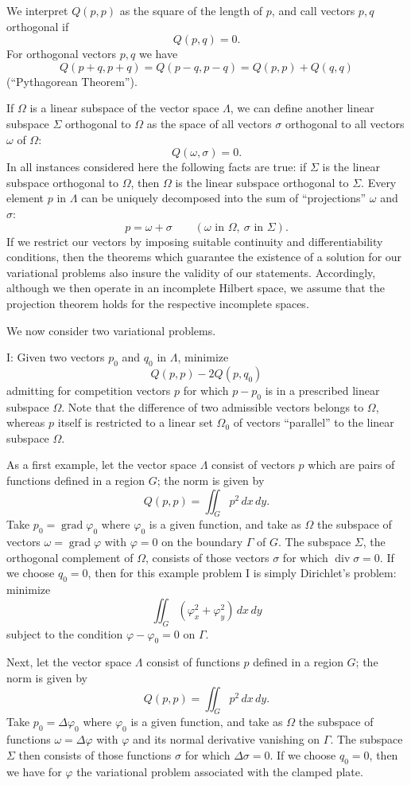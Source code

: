We interpret $Q(p,p)$ as the square of the length of $p$, and call vectors $p,q$ orthogonal if
\[
Q(p,q)=0.
\]
For orthogonal vectors $p,q$ we have
\[
Q(p+q,p+q)=Q(p-q,p-q)=Q(p,p)+Q(q,q)
\]
(``Pythagorean Theorem'').

If $\Omega$ is a linear subspace of the vector space $\Lambda$, we can define another linear subspace $\Sigma$ orthogonal to $\Omega$ as the space of all vectors $\sigma$ orthogonal to all vectors $\omega$ of $\Omega$:
\[
Q(\omega,\sigma)=0.
\]
In all instances considered here the following facts are true: if $\Sigma$ is the linear subspace orthogonal to $\Omega$, then $\Omega$ is the linear subspace orthogonal to $\Sigma$. Every element $p$ in $\Lambda$ can be uniquely decomposed into the sum of ``projections'' $\omega$ and $\sigma$:
\[
p=\omega+\sigma\qquad(\omega\text{ in }\Omega,\ \sigma\text{ in }\Sigma).
\]
If we restrict our vectors by imposing suitable continuity and differentiability conditions, then the theorems which guarantee the existence of a solution for our variational problems also insure the validity of our statements. Accordingly, although we then operate in an incomplete Hilbert space, we assume that the projection theorem holds for the respective incomplete spaces.

We now consider two variational problems.

I: Given two vectors $p_0$ and $q_0$ in $\Lambda$, minimize
\[
Q(p,p)-2Q(p,q_0)
\]
admitting for competition vectors $p$ for which $p-p_0$ is in a prescribed linear subspace $\Omega$. Note that the difference of two admissible vectors belongs to $\Omega$, whereas $p$ itself is restricted to a linear set $\Omega_0$ of vectors ``parallel'' to the linear subspace $\Omega$.

As a first example, let the vector space $\Lambda$ consist of vectors $p$ which are pairs of functions defined in a region $G$; the norm is given by
\[
Q(p,p)=\iint_Gp^2\,dx\,dy.
\]
Take $p_0=\operatorname{grad}\varphi_0$ where $\varphi_0$ is a given function, and take as $\Omega$ the subspace of vectors $\omega=\operatorname{grad}\varphi$ with $\varphi=0$ on the boundary $\Gamma$ of $G$. The subspace $\Sigma$, the orthogonal complement of $\Omega$, consists of those vectors $\sigma$ for which $\operatorname{div}\sigma=0$. If we choose $q_0=0$, then for this example problem I is simply Dirichlet's problem: minimize
\[
\iint_G(\varphi_x^2+\varphi_y^2)\,dx\,dy
\]
subject to the condition $\varphi-\varphi_0=0$ on $\Gamma$.

Next, let the vector space $\Lambda$ consist of functions $p$ defined in a region $G$; the norm is given by
\[
Q(p,p)=\iint_Gp^2\,dx\,dy.
\]
Take $p_0=\Delta\varphi_0$ where $\varphi_0$ is a given function, and take as $\Omega$ the subspace of functions $\omega=\Delta\varphi$ with $\varphi$ and its normal derivative vanishing on $\Gamma$. The subspace $\Sigma$ then consists of those functions $\sigma$ for which $\Delta\sigma=0$. If we choose $q_0=0$, then we have for $\varphi$ the variational problem associated with the clamped plate.

